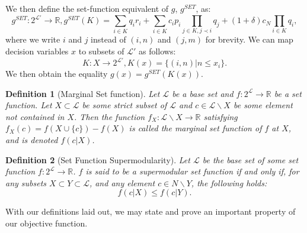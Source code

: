 \documentclass[11pt,authoryear,a4paper]{article}
\newcommand{\RR}{\mathbb{R}}
\newtheorem{definition}{Definition}
\theoremstyle{definition}
\begin{document}
We then define the set-function equivalent of $g$, $g^{SET}$, as:
$$g^{SET}:2^{\mathcal{L}'}\to\RR, g^{SET}(K) = \sum_{i\in K}q_ir_i + \sum_{i\in K}c_ip_i\prod_{j\in K,j\prec i}q_j + (1+\delta)c_N\prod_{i\in K}q_i,$$
where we write $i$ and $j$ instead of $(i,n)$ and $(j,m)$ for brevity. We can map decision variables $x$ to subsets of $\mathcal{L}'$ as follows:
$$K:X\to 2^{\mathcal{L}'}, K(x) = \{(i,n)|n\leq x_i\}.$$
We then obtain the equality $g(x) = g^{SET}(K(x))$.

\begin{definition}[Marginal Set function]
    Let $\mathcal{L}$ be a base set and $f:2^\mathcal{L} \to \RR$ be a set function. Let $X\subset \mathcal{L}$ be some strict subset of $\mathcal{L}$ and $c\in \mathcal{L}\backslash X$ be some element not contained in $X$. Then the function $f_X:\mathcal{L}\backslash X\to \RR$ satisfying $f_X(c) = f(X\cup\{c\}) - f(X)$ is called the marginal set function of $f$ at $X$, and is denoted $f(c|X)$.
\end{definition}

\begin{definition}[Set Function Supermodularity]
    Let $\mathcal{L}$ be the base set of some set function $f:2^\mathcal{L} \to \RR$. $f$ is said to be a supermodular set function if and only if, for any subsets $X \subset Y \subset \mathcal{L}$, and any element $c\in N\backslash Y$, the following holds:
    $$f(c|X) \leq f(c|Y).$$
\end{definition}

With our definitions laid out, we may state and prove an important property of our objective function.
\end{document}

